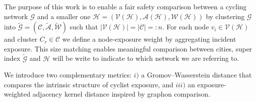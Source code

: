 \documentclass[lettersize,journal]{IEEEtran}
\begin{document}






The purpose of this work is to enable a fair safety comparison between a cycling network $\mathcal{G}$ and a smaller one $\mathcal{H} = (\mathcal{V}(\mathcal{H}),\mathcal{A}(\mathcal{H}),\mathcal{W}(\mathcal{H}))$ by clustering $\mathcal{G}$ into $\tilde{\mathcal{G}}= (\mathcal{C},\tilde{\mathcal{A}},\tilde{\mathcal{W}})$ such that $|\mathcal{V}(\mathcal{H})| = |\mathcal{C}| =: n$. For each node $v_i \in \mathcal{V}(\mathcal{H})$ and cluster $C_r \in \mathcal{C}$ we define a node-exposure weight by aggregating incident exposure. This size matching enables meaningful comparison between cities, super index $\tilde{\mathcal{G}}$ and $\mathcal{H}$ will be write to indicate to which network we are referring to.

We introduce two complementary metrics:
\textit{$i)$} a Gromov--Wasserstein distance that compares the intrinsic structure of cyclist exposure,
and \textit{$iii)$} an exposure-weighted adjacency kernel distance inspired by graphon comparison.
\end{document}
